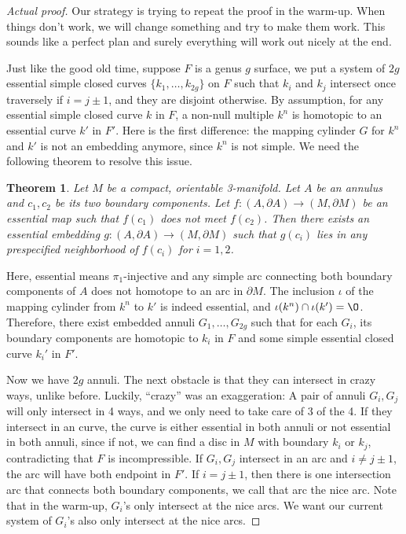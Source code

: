 \documentclass[12pt]{amsart}
\newtheorem{sat}{Theorem}[section]		\newtheorem{lem}[sat]{Lemma}
\theoremstyle{remark}
\begin{document}
\begin{proof}[Actual proof]
	Our strategy is trying to repeat the proof in the warm-up. When things don't work, we will change something and try to make them work. This sounds like a perfect plan and surely everything will work out nicely at the end. 

	Just like the good old time, suppose \(F\) is a genus \(g\) surface, we put a system of \(2g\) essential simple closed curves \(\{k_1, \ldots , k_{2g}\}\) on \(F\) such that \(k_i\) and \(k_j\) intersect once traversely if \(i = j \pm 1\), and they are disjoint otherwise. By assumption, for any essential simple closed curve \(k\) in \(F\), a non-null multiple \(k^n\) is homotopic to an essential curve \(k'\) in \(F'\). Here is the first difference: the mapping cylinder \(G\) for \(k^n\) and \(k'\) is not an embedding anymore, since \(k^n\) is not simple. We need the following theorem to resolve this issue. 

	\begin{sat}
		Let \(M\) be a compact, orientable 3-manifold. Let \(A\) be an annulus and \(c_1, c_2\) be its two boundary components. Let \(f: (A, \partial A) \to (M, \partial M)\) be an essential map such that \(f(c_1)\) does not meet \(f(c_2)\). Then there exists an essential embedding \(g: (A, \partial A) \to (M, \partial M)\) such that \(g(c_i)\) lies in any prespecified neighborhood of \(f(c_i)\) for \(i = 1, 2\). 
	\end{sat}

	Here, essential means \(\pi_1\)-injective and any simple arc connecting both boundary components of \(A\) does not homotope to an arc in \(\partial M\). The inclusion \(\iota\) of the mapping cylinder from \(k^n\) to \(k'\) is indeed essential, and \(\iota(k^n) \cap \iota(k') = \O\). Therefore, there exist embedded annuli \(G_1, \ldots, G_{2g}\) such that for each \(G_i\), its boundary components are homotopic to \(k_i\) in \(F\) and some simple essential closed curve \(k_i'\) in \(F'\).

	Now we have \(2g\) annuli. The next obstacle is that they can intersect in crazy ways, unlike before. Luckily, ``crazy'' was an exaggeration: A pair of annuli \(G_i, G_j\) will only intersect in 4 ways, and we only need to take care of 3 of the 4. If they intersect in an curve, the curve is either essential in both annuli or not essential in both annuli, since if not, we can find a disc in \(M\) with boundary \(k_i\) or \(k_j\), contradicting that \(F\) is incompressible. If \(G_i, G_j\) intersect in an arc and \(i \neq j\pm 1\), the arc will have both endpoint in \(F'\). If \(i = j\pm1\), then there is one intersection arc that connects both boundary components, we call that arc the nice arc. Note that in the warm-up, \(G_i\)'s only intersect at the nice arcs. We want our current system of \(G_i\)'s also only intersect at the nice arcs. 


\end{proof}
\end{document}
